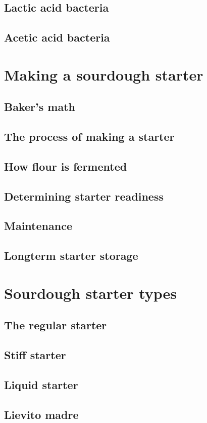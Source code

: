 \documentclass[a4paper, 12pt]{book}
\begin{document}
\section{Lactic acid bacteria}
\section{Acetic acid bacteria}

\chapter{Making a sourdough starter}
\section{Baker's math}
\section{The process of making a starter}
\section{How flour is fermented}
\section{Determining starter readiness}
\section{Maintenance}
\section{Longterm starter storage}

\chapter{Sourdough starter types}
\section{The regular starter}
\section{Stiff starter}
\section{Liquid starter}
\section{Lievito madre}
\end{document}
